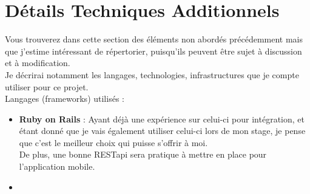 \documentclass[a4paper,10pt,final,fleqn]{article}
\begin{document}
				
	\section{Détails Techniques Additionnels}

		Vous trouverez dans cette section des éléments non abordés précédemment mais que j'estime intéressant de répertorier, puisqu'ils peuvent être sujet à discussion et à modification.\\
		Je décrirai notamment les langages, technologies, infrastructures que je compte utiliser pour ce projet.\\

		Langages (frameworks) utilisés : \\

		\begin{itemize}
			\item \textbf{Ruby on Rails} : Ayant déjà une expérience sur celui-ci pour intégration, et étant donné que je vais également utiliser celui-ci lors de mon stage, je pense que c'est le meilleur choix qui puisse s'offrir à moi.\\
			De plus, une bonne RESTapi sera pratique à mettre en place pour l'application mobile.\\

			 \item \textbf{}
		\end{itemize}
\end{document}
